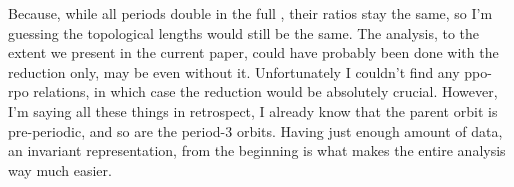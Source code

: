 \begin{description}
Because, while all periods double in the full \statesp , their
ratios stay the same, so I'm guessing the topological lengths
would still be the same. The analysis, to the extent we present in
the current paper, could have probably been done with the 
reduction only, may be even without it. Unfortunately I couldn't
find any ppo-rpo relations, in which case the  reduction
would be absolutely crucial. However, I'm saying all these things
in retrospect, I already know that the parent orbit is
pre-periodic, and so are the period-3 orbits. Having just enough
amount of data, an invariant representation, from the beginning is
what makes the entire analysis way much easier.

\end{description}
